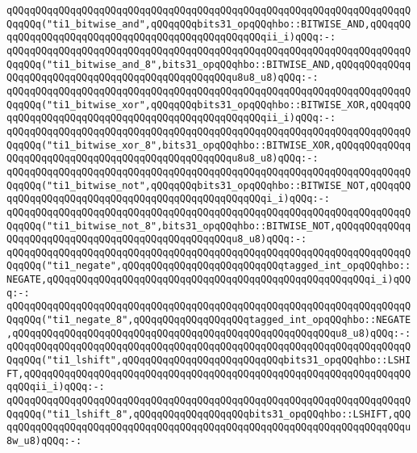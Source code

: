 \newline
\verb|qQQqqQQqqQQqqQQqqQQqqQQqqQQqqQQqqQQqqQQqqQQqqQQqqQQqqQQqqQQqqQQqqQQqqQQqqQQq("ti1_bitwise_and",qQQqqQQqbits31_opqQQqhbo::BITWISE_AND,qQQqqQQqqQQqqQQqqQQqqQQqqQQqqQQqqQQqqQQqqQQqqQQqqQQqii_i)qQQq:-:|\newline
\verb|qQQqqQQqqQQqqQQqqQQqqQQqqQQqqQQqqQQqqQQqqQQqqQQqqQQqqQQqqQQqqQQqqQQqqQQqqQQq("ti1_bitwise_and_8",bits31_opqQQqhbo::BITWISE_AND,qQQqqQQqqQQqqQQqqQQqqQQqqQQqqQQqqQQqqQQqqQQqqQQqqQQqu8u8_u8)qQQq:-:|\newline
\newline
\verb|qQQqqQQqqQQqqQQqqQQqqQQqqQQqqQQqqQQqqQQqqQQqqQQqqQQqqQQqqQQqqQQqqQQqqQQqqQQq("ti1_bitwise_xor",qQQqqQQqbits31_opqQQqhbo::BITWISE_XOR,qQQqqQQqqQQqqQQqqQQqqQQqqQQqqQQqqQQqqQQqqQQqqQQqqQQqii_i)qQQq:-:|\newline
\verb|qQQqqQQqqQQqqQQqqQQqqQQqqQQqqQQqqQQqqQQqqQQqqQQqqQQqqQQqqQQqqQQqqQQqqQQqqQQq("ti1_bitwise_xor_8",bits31_opqQQqhbo::BITWISE_XOR,qQQqqQQqqQQqqQQqqQQqqQQqqQQqqQQqqQQqqQQqqQQqqQQqqQQqu8u8_u8)qQQq:-:|\newline
\newline
\verb|qQQqqQQqqQQqqQQqqQQqqQQqqQQqqQQqqQQqqQQqqQQqqQQqqQQqqQQqqQQqqQQqqQQqqQQqqQQq("ti1_bitwise_not",qQQqqQQqbits31_opqQQqhbo::BITWISE_NOT,qQQqqQQqqQQqqQQqqQQqqQQqqQQqqQQqqQQqqQQqqQQqqQQqqQQqi_i)qQQq:-:|\newline
\verb|qQQqqQQqqQQqqQQqqQQqqQQqqQQqqQQqqQQqqQQqqQQqqQQqqQQqqQQqqQQqqQQqqQQqqQQqqQQq("ti1_bitwise_not_8",bits31_opqQQqhbo::BITWISE_NOT,qQQqqQQqqQQqqQQqqQQqqQQqqQQqqQQqqQQqqQQqqQQqqQQqqQQqu8_u8)qQQq:-:|\newline
\newline
\verb|qQQqqQQqqQQqqQQqqQQqqQQqqQQqqQQqqQQqqQQqqQQqqQQqqQQqqQQqqQQqqQQqqQQqqQQqqQQq("ti1_negate",qQQqqQQqqQQqqQQqqQQqqQQqqQQqtagged_int_opqQQqhbo::NEGATE,qQQqqQQqqQQqqQQqqQQqqQQqqQQqqQQqqQQqqQQqqQQqqQQqqQQqqQQqi_i)qQQq:-:|\newline
\verb|qQQqqQQqqQQqqQQqqQQqqQQqqQQqqQQqqQQqqQQqqQQqqQQqqQQqqQQqqQQqqQQqqQQqqQQqqQQq("ti1_negate_8",qQQqqQQqqQQqqQQqqQQqtagged_int_opqQQqhbo::NEGATE,qQQqqQQqqQQqqQQqqQQqqQQqqQQqqQQqqQQqqQQqqQQqqQQqqQQqqQQqu8_u8)qQQq:-:|\newline
\newline
\verb|qQQqqQQqqQQqqQQqqQQqqQQqqQQqqQQqqQQqqQQqqQQqqQQqqQQqqQQqqQQqqQQqqQQqqQQqqQQq("ti1_lshift",qQQqqQQqqQQqqQQqqQQqqQQqqQQqbits31_opqQQqhbo::LSHIFT,qQQqqQQqqQQqqQQqqQQqqQQqqQQqqQQqqQQqqQQqqQQqqQQqqQQqqQQqqQQqqQQqqQQqqQQqii_i)qQQq:-:|\newline
\verb|qQQqqQQqqQQqqQQqqQQqqQQqqQQqqQQqqQQqqQQqqQQqqQQqqQQqqQQqqQQqqQQqqQQqqQQqqQQq("ti1_lshift_8",qQQqqQQqqQQqqQQqqQQqbits31_opqQQqhbo::LSHIFT,qQQqqQQqqQQqqQQqqQQqqQQqqQQqqQQqqQQqqQQqqQQqqQQqqQQqqQQqqQQqqQQqqQQqqQQqu8w_u8)qQQq:-:|\newline
